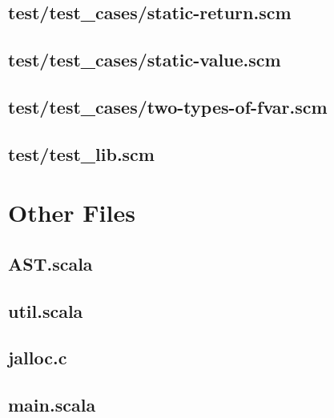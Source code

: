 \documentclass{article}
\begin{document}
    \subsection{test/test\_cases/static-return.scm}
    
    \subsection{test/test\_cases/static-value.scm}
    
    \subsection{test/test\_cases/two-types-of-fvar.scm}
    
    \newpage
    \subsection{test/test\_lib.scm}
    
    \newpage
        
    \section{Other Files}
    \subsection{AST.scala}
    
    \newpage
    \subsection{util.scala}
    
    \newpage
    \subsection{jalloc.c}
    
    \newpage
    \subsection{main.scala}
    
    \newpage

\end{document}
